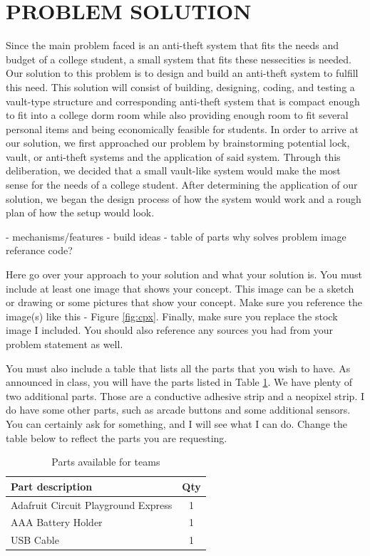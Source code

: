 \documentclass[12pt]{article}
\begin{document}
\section{PROBLEM SOLUTION}

Since the main problem faced is an anti-theft system that fits the needs and budget of a college student, a small system that fits these nessecities is needed. Our solution to this problem is to design and build an anti-theft system to fulfill this need. This solution will consist of building, designing, coding, and testing a vault-type structure and corresponding anti-theft system that is compact enough to fit into a college dorm room while also providing enough room to fit several personal items and being economically feasible for students.
In order to arrive at our solution, we first approached our problem by brainstorming potential lock, vault, or anti-theft systems and the application of said system. Through this deliberation, we decided that a small vault-like system would make the most sense for the needs of a college student. After determining the application of our solution, we began the design process of how the system would work and a rough plan of how the setup would look.


- mechanisms/features
- build ideas
- table of parts
why solves problem
image
referance
code?

Here go over your approach to your solution and what your solution is. You must include at least one image that shows your concept. This image can be a sketch or drawing or some pictures that show your concept. Make sure you reference the image(s) like this - Figure \ref{fig:cpx}. Finally, make sure you replace the stock image I included. You should also reference any sources you had from your problem statement as well.

You must also include a table that lists all the parts that you wish to have. As announced in class, you will have the parts listed in Table \ref{table:parts_list}. We have plenty of two additional parts. Those are a conductive adhesive strip and a neopixel strip. I do have some other parts, such as arcade buttons and some additional sensors. You can certainly ask for something, and I will see what I can do. Change the table below to reflect the parts you are requesting.

\begin{table}[ht]
  \caption{Parts available for teams}
  \label{table:parts_list}
  \begin{center}
  \begin{tabular}{|p{3in}|c|}
  
  \hline
  Part description & Qty\\
  \hline
  \hline
  Adafruit Circuit Playground Express & 1 \\
  \hline
  AAA Battery Holder & 1 \\
  \hline
  USB Cable & 1 \\
  \hline
  \end{tabular}
  \end{center}
  \end{table}
\end{document}

